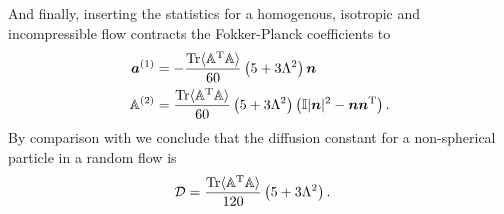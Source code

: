 \documentclass[thesis.tex]{subfiles}
\begin{document}
And finally, inserting the statistics for a homogenous, isotropic and incompressible flow  contracts the Fokker-Planck coefficients to 
\begin{align*}
	\mbox{\boldmath$a$}^{(1)} &= -\frac{\mbox{Tr}\langle\mathbb{A}^{\mathrm T} \mathbb{A}\rangle}{60} \left(5 + 3\Lambda^2 \right)\mbox{\boldmath$n$}\\
	\mathbb{A}^{(2)}  &= \frac{\mbox{Tr}\langle\mathbb{A}^{\mathrm T} \mathbb{A}\rangle}{60} \left(5 + 3\Lambda^2 \right)\left(\mathbb{I}|\mbox{\boldmath$n$}|^2 - \mbox{\boldmath$n$}\mbox{\boldmath$n$}^{\mathrm T} \right ).
\end{align*}
By comparison with  we conclude that the diffusion constant for a non-spherical particle in a random flow is
\begin{align*}
	\mathcal D &= \frac{\mbox{Tr}\langle\mathbb{A}^{\mathrm T} \mathbb{A}\rangle}{120} \left(5 + 3\Lambda^2 \right).
\end{align*}
\end{document}

